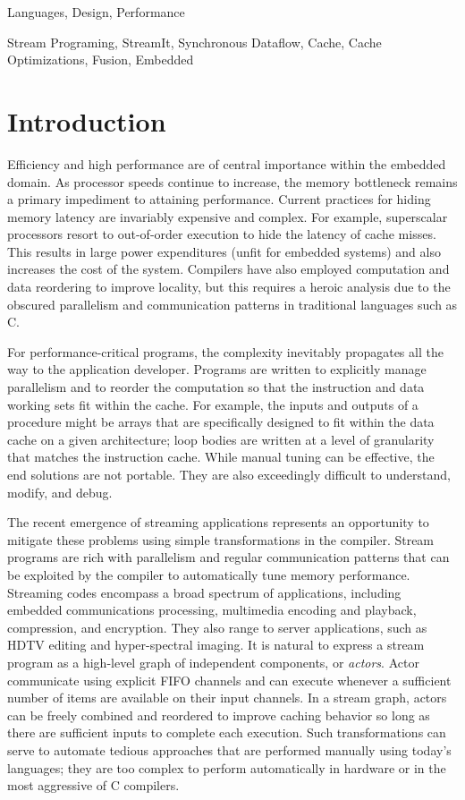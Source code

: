 \documentclass{sigplanconf}
\begin{document}
\terms 
Languages, Design, Performance

\keywords
Stream Programing, StreamIt, Synchronous Dataflow, Cache, Cache
Optimizations, Fusion, Embedded

\section{Introduction}

Efficiency and high performance are of central importance within the
embedded domain.  As processor speeds continue to increase, the memory
bottleneck remains a primary impediment to attaining performance.
Current practices for hiding memory latency are invariably expensive
and complex.  For example, superscalar processors resort to
out-of-order execution to hide the latency of cache misses.  This
results in large power expenditures (unfit for embedded systems) and
also increases the cost of the system.  Compilers have also employed
computation and data reordering to improve locality, but this requires
a heroic analysis due to the obscured parallelism and communication
patterns in traditional languages such as C.

For performance-critical programs, the complexity inevitably
propagates all the way to the application developer.  Programs are
written to explicitly manage parallelism and to reorder the
computation so that the instruction and data working sets fit within
the cache.  For example, the inputs and outputs of a procedure might
be arrays that are specifically designed to fit within the data cache
on a given architecture; loop bodies are written at a level of
granularity that matches the instruction cache.  While manual tuning
can be effective, the end solutions are not portable.  They are also
exceedingly difficult to understand, modify, and debug.

The recent emergence of streaming applications represents an
opportunity to mitigate these problems using simple transformations in
the compiler.  Stream programs are rich with parallelism and regular
communication patterns that can be exploited by the compiler to
automatically tune memory performance.  Streaming codes encompass a
broad spectrum of applications, including embedded communications
processing, multimedia encoding and playback, compression, and
encryption.  They also range to server applications, such as HDTV
editing and hyper-spectral imaging.  It is natural to express a stream
program as a high-level graph of independent components, or {\it
actors}.  Actor communicate using explicit FIFO channels and can
execute whenever a sufficient number of items are available on their
input channels.  In a stream graph, actors can be freely combined and
reordered to improve caching behavior so long as there are sufficient
inputs to complete each execution.  Such transformations can serve to
automate tedious approaches that are performed manually using today's
languages; they are too complex to perform automatically in hardware
or in the most aggressive of C compilers.
\end{document}
